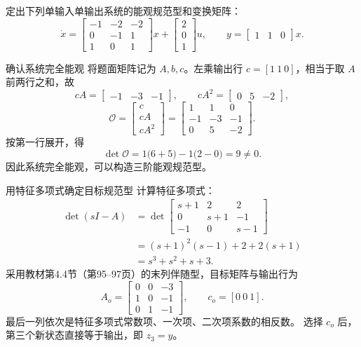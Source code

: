 \documentclass[11pt]{article}
\begin{document}
\begin{problem}[原题 13]
定出下列单输入单输出系统的能观规范型和变换矩阵：
\[
\dot x=\begin{bmatrix}-1&-2&-2\\0&-1&1\\1&0&1\end{bmatrix}x
+\begin{bmatrix}2\\0\\1\end{bmatrix}u,
\qquad y=\begin{bmatrix}1&1&0\end{bmatrix}x.
\]
\end{problem}
\begin{solution}
\begin{proofstep}{确认系统完全能观}
将题面矩阵记为 $A,b,c$。左乘输出行 $c=[1\ 1\ 0]$，相当于取 $A$ 前两行之和，故
\[
cA=\begin{bmatrix}-1&-3&-1\end{bmatrix},\qquad
cA^2=\begin{bmatrix}0&5&-2\end{bmatrix},
\]
\[
\mathcal O=\begin{bmatrix}c\\cA\\cA^2\end{bmatrix}
=\begin{bmatrix}1&1&0\\-1&-3&-1\\0&5&-2\end{bmatrix}.
\]
按第一行展开，得
\[
\det\mathcal O=1\bigl(6+5\bigr)-1\bigl(2-0\bigr)=9\ne0.
\]
因此系统完全能观，可以构造三阶能观规范型。
\end{proofstep}

\begin{proofstep}{用特征多项式确定目标规范型}
计算特征多项式：
\begin{align*}
\det(sI-A)
&=\det\begin{bmatrix}s+1&2&2\\0&s+1&-1\\-1&0&s-1\end{bmatrix}\\
&=(s+1)^2(s-1)+2+2(s+1)\\
&=s^3+s^2+s+3.
\end{align*}
采用教材第4.4节（第95--97页）的末列伴随型，目标矩阵与输出行为
\[
A_o=\begin{bmatrix}0&0&-3\\1&0&-1\\0&1&-1\end{bmatrix},\qquad
c_o=[0\ 0\ 1].
\]
最后一列依次是特征多项式常数项、一次项、二次项系数的相反数。
选择 $c_o$ 后，第三个新状态直接等于输出，即 $z_3=y$。
\end{proofstep}


\end{solution}
\end{document}
